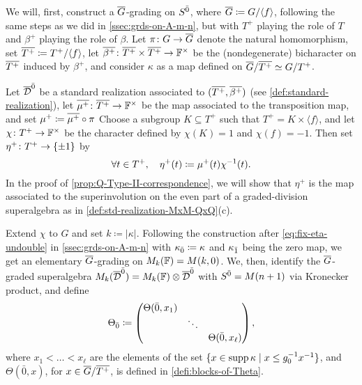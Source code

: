 We will, first, construct a $\barr G$-grading on $S^{\bar0}$, where $\barr G \coloneqq G/\langle f \rangle$, following the same steps as we did in \cref{ssec:grds-on-A-m-n}, but with $T^+$ playing the role of $T$ and $\beta^+$ playing the role of $\beta$. 
Let $\pi\from G \to \barr G$ denote the natural homomorphism, set $\barr {T^+} \coloneqq T^+/\langle f \rangle$, let $\barr {\beta^+}\from \barr {T^+} \times \barr {T^+} \to \FF^\times$ be the (nondegenerate) bicharacter on $\barr {T^+}$ induced by $\beta^+$, and consider $\kappa$ as a map defined on $\barr G/\barr {T^+} \iso G/{T^+}$.

Let $\barr \D\even$ be a standard realization associated to $(\barr{T^+}, \barr{\beta^+})$ (see \cref{def:standard-realization}), let $\barr {\mu^+}\from \barr{T^+} \to \FF^\times$ be the map associated to the transposition map, and set $\mu^+ \coloneqq \barr {\mu^+} \circ \pi$
Choose a subgroup $K \subseteq T^+$ such that $T^+ = K \times \langle f \rangle$, and let $\chi\colon T^+ \to \mathbb{F}^\times$ be the character defined by $\chi(K) = 1$ and $\chi(f) = -1$. 
Then set $\eta^+\colon T^+ \to \{ \pm 1 \}$ by
\[\label{eq:fix-eta-undouble-Q-v2}
    \forall t\in T^+, \quad \eta^+(t) \coloneqq \mu^+(t) \chi^{-1}(t).
\] 
In the proof of \cref{prop:Q-Type-II-correspondence}, we will show that $\eta^+$ is the map associated to the superinvolution on the even part of a graded-division superalgebra as in \cref{def:std-realization-MxM-QxQ}(c). 

Extend $\chi$ to $G$ and set $k \coloneqq |\kappa|$. 
Following the construction after \cref{eq:fix-eta-undouble} in \cref{ssec:grds-on-A-m-n} with $\kappa_{\bar{0}} \coloneqq \kappa$ and $\kappa_{\bar{1}}$ being the zero map, we get an elementary $\barr G$-grading on $M_k(\mathbb{F}) = M(k , 0)$. 
We, then, identify the $\barr G$-graded superalgebra $M_{k}(\barr \D\even) = M_{k}(\FF) \tensor \barr\D\even$ with $S^{\bar0} = M(n+1)$ via Kronecker product, and define 
\[\label{eq:puting-the-blocks-of-Phi-together-version-Q-v2}
    \Theta_{\bar{0}} \coloneqq \begin{pmatrix}
        \Theta(\bar 0, x_1)&& \\
        & \ddots &\\
        && \Theta(\bar 0, x_{\ell})
    \end{pmatrix},
\]
where $x_1 < \ldots < x_{\ell}$ are the elements of the set $\{ x \in \operatorname{supp} \kappa \mid x \leq g_0^{-1} x^{-1} \}$, and $\Theta(\bar 0, x)$, for $x\in \barr G/\barr {T^+}$, is defined in \cref{defi:blocks-of-Theta}. 

